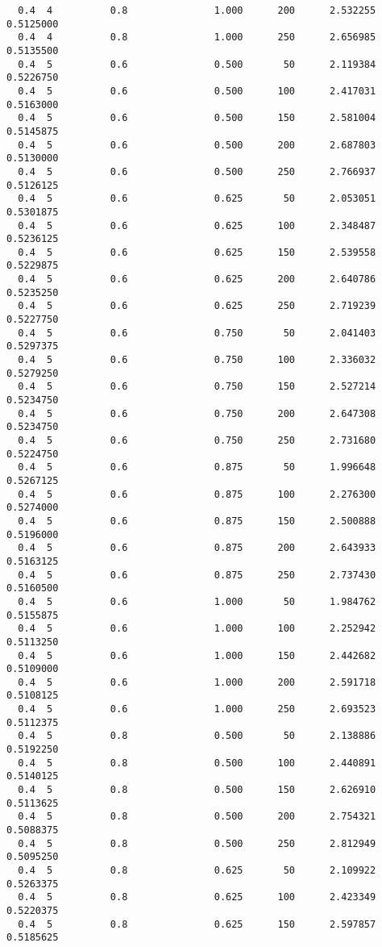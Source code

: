 \documentclass[
  letterpaper,
  DIV=11,
  numbers=noendperiod]{scrartcl}
\begin{document}
\begin{verbatim}
  0.4  4          0.8               1.000      200      2.532255  0.5125000
  0.4  4          0.8               1.000      250      2.656985  0.5135500
  0.4  5          0.6               0.500       50      2.119384  0.5226750
  0.4  5          0.6               0.500      100      2.417031  0.5163000
  0.4  5          0.6               0.500      150      2.581004  0.5145875
  0.4  5          0.6               0.500      200      2.687803  0.5130000
  0.4  5          0.6               0.500      250      2.766937  0.5126125
  0.4  5          0.6               0.625       50      2.053051  0.5301875
  0.4  5          0.6               0.625      100      2.348487  0.5236125
  0.4  5          0.6               0.625      150      2.539558  0.5229875
  0.4  5          0.6               0.625      200      2.640786  0.5235250
  0.4  5          0.6               0.625      250      2.719239  0.5227750
  0.4  5          0.6               0.750       50      2.041403  0.5297375
  0.4  5          0.6               0.750      100      2.336032  0.5279250
  0.4  5          0.6               0.750      150      2.527214  0.5234750
  0.4  5          0.6               0.750      200      2.647308  0.5234750
  0.4  5          0.6               0.750      250      2.731680  0.5224750
  0.4  5          0.6               0.875       50      1.996648  0.5267125
  0.4  5          0.6               0.875      100      2.276300  0.5274000
  0.4  5          0.6               0.875      150      2.500888  0.5196000
  0.4  5          0.6               0.875      200      2.643933  0.5163125
  0.4  5          0.6               0.875      250      2.737430  0.5160500
  0.4  5          0.6               1.000       50      1.984762  0.5155875
  0.4  5          0.6               1.000      100      2.252942  0.5113250
  0.4  5          0.6               1.000      150      2.442682  0.5109000
  0.4  5          0.6               1.000      200      2.591718  0.5108125
  0.4  5          0.6               1.000      250      2.693523  0.5112375
  0.4  5          0.8               0.500       50      2.138886  0.5192250
  0.4  5          0.8               0.500      100      2.440891  0.5140125
  0.4  5          0.8               0.500      150      2.626910  0.5113625
  0.4  5          0.8               0.500      200      2.754321  0.5088375
  0.4  5          0.8               0.500      250      2.812949  0.5095250
  0.4  5          0.8               0.625       50      2.109922  0.5263375
  0.4  5          0.8               0.625      100      2.423349  0.5220375
  0.4  5          0.8               0.625      150      2.597857  0.5185625

\end{verbatim}
\end{document}
